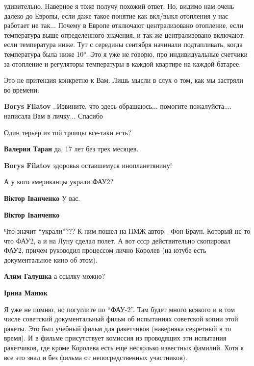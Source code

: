 \begin{itemize}
\begin{itemize}
удивительно. Наверное я тоже получу похожий ответ. Но, видимо нам очень далеко
до Европы, если даже такое понятие как вкл/выкл отопления у нас работает не
так... Почему в Европе отключают централизовано отопление, если температура
выше определенного значения, и так же централизовано включают, если температура
ниже. Тут с середины сентября начинали подтапливать, когда температура была
ниже 10°. Это я уже не говорю, про индивидуальные счетчики за отопление и
регуляторы температуры в каждой квартире на каждой батарее.

Это не притензия конкретно к Вам. Лишь мысли в слух о том, как мы застряли во
времени.

\textbf{Borys Filatov} ..Извините, что здесь обращаюсь... помогите пожалуйста.... написала Вам в личку... Спасибо

\end{itemize} %

Один терьер из той троицы все-таки есть?

\begin{itemize} %
\textbf{Валерия Таран} да, 17 лет без трех месяцев.

\textbf{Borys Filatov} здоровья оставшемуся инопланетянину!
\end{itemize} %

А у кого американцы украли ФАУ2?

\begin{itemize} %
\textbf{Віктор Іванченко} У вас.

\textbf{Віктор Іванченко} 

Что значит \enquote{украли}??? К ним пошел на ПМЖ автор - Фон Браун. Который не то что
ФАУ2, а и на Луну сделал полет. А вот ссср действительно скопировал ФАУ2,
причем руководил процессом лично Королев (на ютубе есть документальное кино об
этом).

\textbf{Алим Галушка} а ссылку можно?

\textbf{Ірина Манюк} 

Я уже не помню, но погуглите по \enquote{ФАУ-2}. Там будет много всякого и в том числе
советский документальный фильм об испытаниях советской копии этой ракеты. Это
был учебный фильм для ракетчиков (наверняка секретный в то время). И в фильме
присутствует комиссия из проводящих эти испытания ракетчиков, где кроме
Королева есть еще несколько известных фамилий. Хотя я все это знал и без фильма
от непосредственных участников).



\end{itemize}
\end{itemize}
